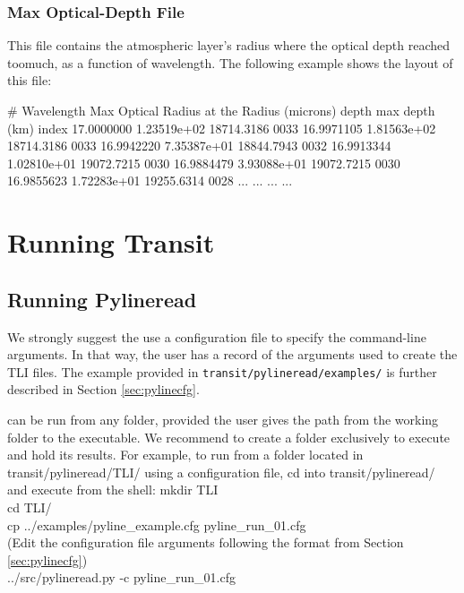 \documentclass[letterpaper, 12pt]{article}
\begin{document}
\subsubsection{Max Optical-Depth File}

This file contains the atmospheric layer's
radius where the optical depth reached {\tttm toomuch}, as a function
of wavelength.  The following example shows the layout of this file:
\begin{plain}
# Wavelength   Max Optical   Radius at the    Radius
   (microns)         depth   max depth (km)    index
  17.0000000   1.23519e+02       18714.3186     0033
  16.9971105   1.81563e+02       18714.3186     0033
  16.9942220   7.35387e+01       18844.7943     0032
  16.9913344   1.02810e+01       19072.7215     0030
  16.9884479   3.93088e+01       19072.7215     0030
  16.9855623   1.72283e+01       19255.6314     0028
     ...               ...
     ...               ...
\end{plain}
\phantom{.\\}  %

\section{Running Transit}
\label{sec:running}

\subsection{Running Pylineread}
\label{sec:runpyline}

We strongly suggest the use a configuration file to specify the
command-line arguments.  In that way, the user has a record of the
arguments used to create the TLI files.  The example provided in
\texttt{transit/pylineread/examples/} is further described in
Section \ref{sec:pylinecfg}.

{\pylineread} can be run from any folder, provided the user gives the
path from the working folder to the executable.  We recommend to
create a folder exclusively to execute {\pylineread} and hold its
results.  For example, to run {\pylineread} from a folder located in
{\tttm transit/pylineread/TLI/} using a configuration file, cd into
{\tttm transit/pylineread/} and execute from the shell: \newline
{\tttb mkdir TLI} \\
{\tttb cd TLI/}   \\
{\tttb cp ../examples/pyline\_example.cfg pyline\_run\_01.cfg} \\
(Edit the configuration file arguments following the format from
  Section \ref{sec:pylinecfg}) \\
{\tttb ../src/pylineread.py -c pyline\_run\_01.cfg} \\
\end{document}
